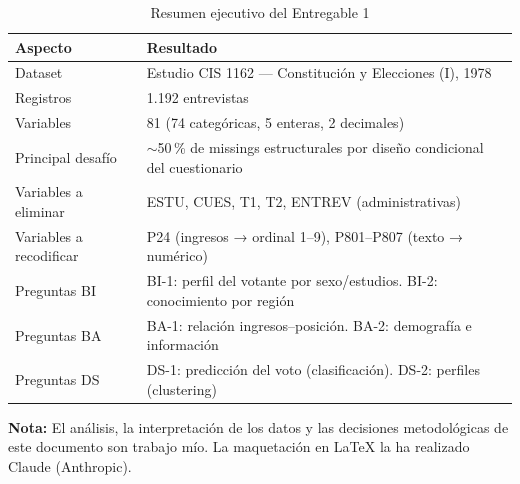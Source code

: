 \documentclass[12pt,a4paper]{article}
\newcommand{\thead}[1]{\cellcolor{tableheader}\color{white}\textbf{#1}}
\begin{document}
\begin{table}[H]
\centering
\renewcommand{\arraystretch}{1.4}
\begin{tabularx}{\linewidth}{p{4cm} X}
\toprule
\thead{Aspecto} & \thead{Resultado} \\
\midrule
Dataset              & Estudio CIS 1162 — Constitución y Elecciones (I), 1978 \\
\rowcolor{tablerow}
Registros            & 1.192 entrevistas \\
Variables            & 81 (74 categóricas, 5 enteras, 2 decimales) \\
\rowcolor{tablerow}
Principal desafío    & $\sim$50\,\% de missings estructurales por diseño condicional del cuestionario \\
Variables a eliminar & ESTU, CUES, T1, T2, ENTREV (administrativas) \\
\rowcolor{tablerow}
Variables a recodificar & P24 (ingresos → ordinal 1--9), P801--P807 (texto → numérico) \\
Preguntas BI         & BI-1: perfil del votante por sexo/estudios. BI-2: conocimiento por región \\
\rowcolor{tablerow}
Preguntas BA         & BA-1: relación ingresos--posición. BA-2: demografía e información \\
Preguntas DS         & DS-1: predicción del voto (clasificación). DS-2: perfiles (clustering) \\
\bottomrule
\end{tabularx}
\caption{Resumen ejecutivo del Entregable 1}
\end{table}

\vspace{1em}

\vfill
\begin{tcolorbox}[colback=light, colframe=primary!40, boxrule=0.5pt, arc=3pt]
  \small\color{gray}
  \textbf{Nota:} El análisis, la interpretación de los datos y las
  decisiones metodológicas de este documento son trabajo mío.
  La maquetación en \LaTeX{} la ha realizado Claude (Anthropic).
\end{tcolorbox}
\end{document}
